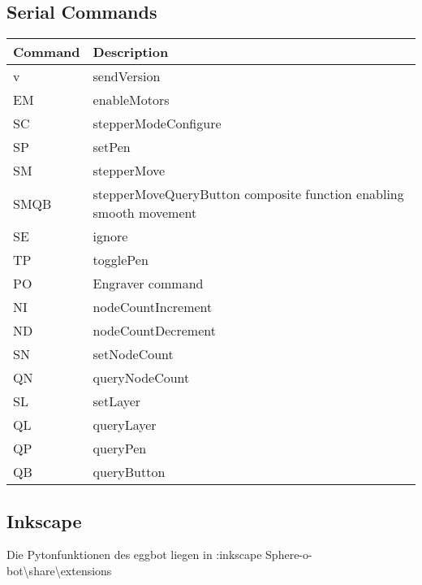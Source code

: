 \subsection{Serial Commands}
\begin{minipage}[t]{1.0\textwidth}
\begin{tabular}{|p{}|p{}|}
\hline
\CItoprowcolor \textbf{Command} & \textbf{Description}\\
\hline
v & sendVersion\\
\hline
EM & enableMotors\\
\hline
SC & stepperModeConfigure\\
\hline
SP & setPen\\
\hline
SM & stepperMove\\
\hline
SMQB & stepperMoveQueryButton composite function enabling smooth movement\\
\hline
SE & ignore\\
\hline
TP & togglePen\\
\hline
PO & Engraver command\\
\hline
NI & nodeCountIncrement\\
\hline
ND & nodeCountDecrement\\
\hline
SN & setNodeCount\\
\hline
QN & queryNodeCount\\
\hline
SL & setLayer\\
\hline
QL & queryLayer\\
\hline
QP & queryPen\\
\hline
QB & queryButton\\
\hline
\end{tabular}
\label{tab:Tabelle1}
\end{minipage}




\subsection{Inkscape}
Die Pytonfunktionen des eggbot liegen in :inkscape Sphere-o-bot\textbackslash share\textbackslash extensions\\
 